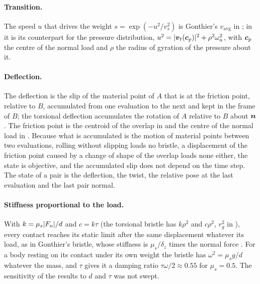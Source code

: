 \paragraph{Transition.} The speed $u$ that drives the weight $s = \exp(-u^2/v_s^2)$ is
Gonthier's $v_\mathrm{avg}$ in ; in  it is its counterpart for
the pressure distribution, $u^2 = |\boldsymbol{v}_t(\boldsymbol{c}_p)|^2 + \rho^2\omega_n^2$, with $\boldsymbol{c}_p$
the centre of the normal load and $\rho$ the radius of gyration of the pressure about it.

\paragraph{Deflection.} The deflection is the slip of the material point of $A$ that is at the
friction point, relative to $B$, accumulated from one evaluation to the next and kept in the
frame of $B$; the torsional deflection accumulates the rotation of $A$ relative to $B$ about
$\boldsymbol{n}$. The friction point is the centroid of the overlap in  and the centre of the
normal load in . Because what is accumulated is the motion of material points
between two evaluations, rolling without slipping loads no bristle, a displacement of the
friction point caused by a change of shape of the overlap loads none either, the state is
objective, and the accumulated slip does not depend on the time step. The state of a pair is
the deflection, the twist, the relative pose at the last evaluation and the last pair normal.

\paragraph{Stiffness proportional to the load.} With $k = \mu_s|F_n|/d$ and $c = k\tau$ (the
torsional bristle has $k\rho^2$ and $c\rho^2$, $r_g^2$ in ), every contact
reaches its static limit after the same displacement whatever its load, as in Gonthier's
bristle, whose stiffness is $\mu_s/\delta_z$ times the normal force \cite{Gonthier2007thesis}.
For a body resting on its contact under its own weight the bristle has $\omega^2 = \mu_s g/d$
whatever the mass, and $\tau$ gives it a damping ratio $\tau\omega/2 \approx 0.55$ for
$\mu_s = 0.5$. The sensitivity of the results to $d$ and $\tau$ was not swept.

